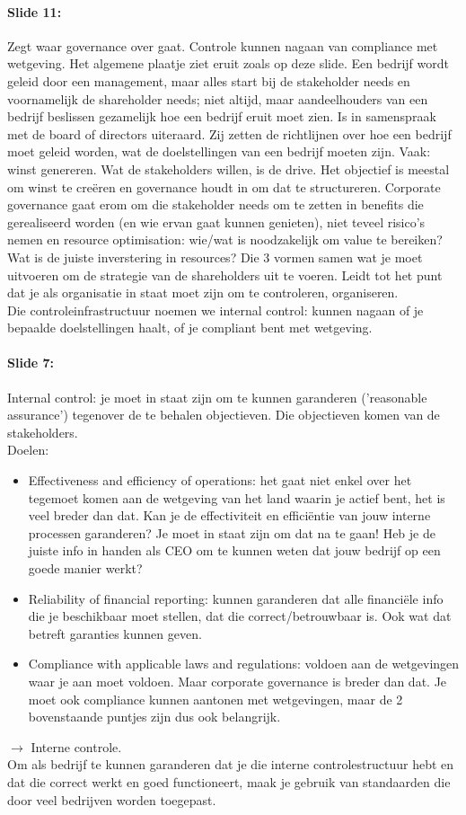 \documentclass[10pt,a4paper]{report}
\begin{document}
\paragraph{Slide 11:}Zegt waar governance over gaat. Controle kunnen nagaan van compliance met wetgeving. Het algemene plaatje ziet eruit zoals op deze slide. Een bedrijf wordt geleid door een management, maar alles start bij de stakeholder needs en voornamelijk de shareholder needs; niet altijd, maar aandeelhouders van een bedrijf beslissen gezamelijk hoe een bedrijf eruit moet zien. Is in samenspraak met de board of directors uiteraard. Zij zetten de richtlijnen over hoe een bedrijf moet geleid worden, wat de doelstellingen van een bedrijf moeten zijn. Vaak: winst genereren. Wat de stakeholders willen, is de drive. Het objectief is meestal om winst te creëren en governance houdt in om dat te structureren. Corporate governance gaat erom om die stakeholder needs om te zetten in benefits die gerealiseerd worden (en wie ervan gaat kunnen genieten), niet teveel risico's nemen en resource optimisation: wie/wat is noodzakelijk om value te bereiken? Wat is de juiste inverstering in resources?
Die 3 vormen samen wat je moet uitvoeren om de strategie van de shareholders uit te voeren. Leidt tot het punt dat je als organisatie in staat moet zijn om te controleren, organiseren.\\
Die controleinfrastructuur noemen we internal control: kunnen nagaan of je bepaalde doelstellingen haalt, of je compliant bent met wetgeving.

\paragraph{Slide 7:}Internal control: je moet in staat zijn om te kunnen garanderen ('reasonable assurance') tegenover de te behalen objectieven. Die objectieven komen van de stakeholders.\\
Doelen:
\begin{itemize}
\item Effectiveness and efficiency of operations: het gaat niet enkel over het tegemoet komen aan de wetgeving van het land waarin je actief bent, het is veel breder dan dat. Kan je de effectiviteit en efficiëntie van jouw interne processen garanderen? Je moet in staat zijn om dat na te gaan! Heb je de juiste info in handen als CEO om te kunnen weten dat jouw bedrijf op een goede manier werkt?
\item Reliability of financial reporting: kunnen garanderen dat alle financiële info die je beschikbaar moet stellen, dat die correct/betrouwbaar is. Ook wat dat betreft garanties kunnen geven.
\item Compliance with applicable laws and regulations: voldoen aan de wetgevingen waar je aan moet voldoen. Maar corporate governance is breder dan dat. Je moet ook compliance kunnen aantonen met wetgevingen, maar de 2 bovenstaande puntjes zijn dus ook belangrijk.
\end{itemize}
$\rightarrow$ Interne controle.\\
Om als bedrijf te kunnen garanderen dat je die interne controlestructuur hebt en dat die correct werkt en goed functioneert, maak je gebruik van standaarden die door veel bedrijven worden toegepast.
\end{document}
